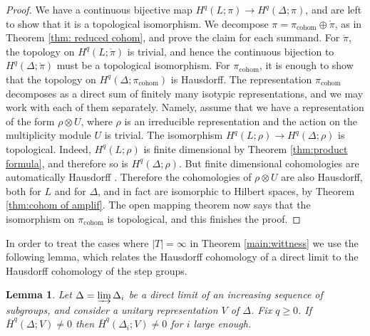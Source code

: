 \documentclass[12pt,reqno]{amsart}
\newtheorem{lemma}[theorem]{Lemma}
\theoremstyle{definition}
\newcommand{\abs}[1]{\left| #1 \right|}
\begin{document}
\begin{proof}
    We have a continuous bijective map $H^q(L;\pi) \to H^q(\Delta;\pi)$, and are left to show that it is a topological isomorphism. We decompose $\pi=\pi_\mathrm{cohom} \oplus \mathring{\pi}$, as in Theorem \ref{thm: reduced cohom}, and prove the claim for each summand. For $\mathring{\pi}$, the topology on $H^q(L;\mathring\pi)$ is trivial, and hence the continuous bijection to $H^q(\Delta;\mathring\pi)$ must be a topological isomorphism. For $\pi_\mathrm{cohom}$, it is enough to show that the topology on $H^q(\Delta;\pi_\mathrm{cohom})$ is Hausdorff. The representation $\pi_\mathrm{cohom}$ decomposes as a direct sum of finitely many isotypic representations, and we may work with each of them separately. Namely, assume that we have a representation of the form $\rho \otimes U$, where $\rho$ is an irreducible representation and the action on the multiplicity module $U$ is trivial. The isomorphism $H^q(L;\rho) \to H^q(\Delta;\rho)$ is topological. Indeed, $H^q(L;\rho)$ is finite dimensional by Theorem \ref{thm:product formula}, and therefore so is $H^q(\Delta;\rho)$. But finite dimensional cohomologies are automatically Hausdorff \cite[Lemma~IV.3.4]{BorelWallach}. Therefore the cohomologies of $\rho \otimes U$ are also Hausdorff, both for $L$ and for $\Delta$, and in fact are isomorphic to Hilbert spaces, by Theorem \ref{thm:cohom of amplif}. The open mapping theorem now says that the isomorphism on $\pi_\mathrm{cohom}$ is topological, and this finishes the proof.
\end{proof}
In order to treat the cases where $\abs{T}=\infty$ in Theorem \ref{main:wittness} we use the following lemma, which relates the Hausdorff cohomology of a direct limit to the Hausdorff cohomology of the step groups.
\begin{lemma}\label{lemma:HausdorffCohomLimitgroups}
    Let $\Delta=\varinjlim \Delta_i$ be a direct limit of an increasing sequence of subgroups, and consider a unitary representation $V$ of $\Delta$. Fix $q \geq 0$. If $\bar{H}^q(\Delta ; V) \ne 0$ then $\bar{H}^q(\Delta_i ; V) \ne 0$ for $i$ large enough.
\end{lemma}
\end{document}
